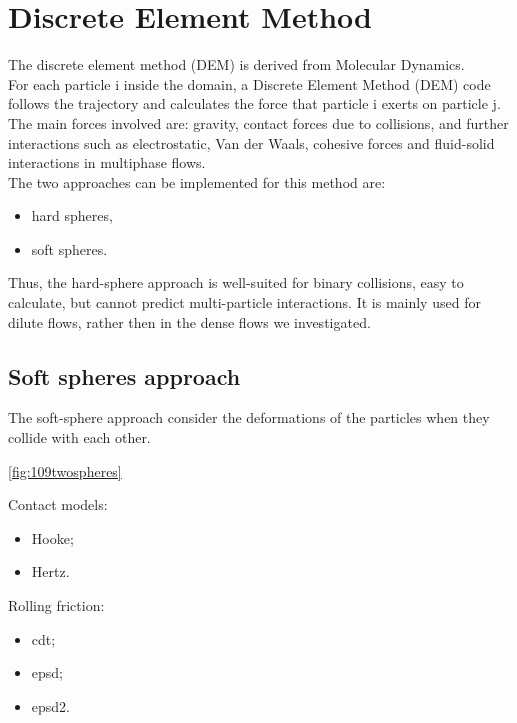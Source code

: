 
\chapter{Discrete Element Method}
\label{cap:dem}

The discrete element method (\acs{DEM}) is derived from Molecular Dynamics. \\ 
For each particle i inside the domain, a Discrete Element Method (\acs{DEM}) code
follows the trajectory and calculates the force that particle i exerts on particle j.
The main forces involved are: gravity, contact forces due to collisions, and
further interactions such as electrostatic, Van der Waals, cohesive forces and fluid-solid interactions in 
multiphase flows. \\
The two approaches can be implemented for this method are:
\begin{itemize}
  \item{hard spheres,}
  \item{soft spheres.}
\end{itemize} 
Thus, the hard-sphere approach is well-suited for binary collisions, easy to
calculate, but cannot predict multi-particle interactions.
It is mainly used for dilute flows, rather then in the dense flows we
investigated.


\section{Soft spheres approach}
\label{sec:softspheresapproach}

The soft-sphere approach consider the deformations of the particles when they
collide with each other.

\ref{fig:109twospheres}

Contact models:
\begin{itemize}
  \item{Hooke;}
  \item{Hertz.}
\end{itemize}
Rolling friction:
\begin{itemize}
  \item{cdt;}
  \item{epsd;}
  \item{epsd2.}
\end{itemize}

